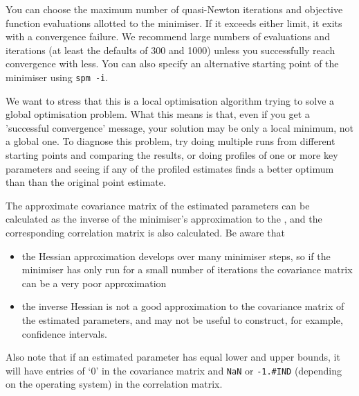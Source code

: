 You can choose the maximum number of quasi-Newton iterations and objective function evaluations allotted to the minimiser. If it exceeds either limit, it exits with a convergence failure. We recommend large numbers of evaluations and iterations (at least the defaults of 300 and 1000) unless you successfully reach convergence with less. You can also specify an alternative starting point of the minimiser using \texttt{spm -i}.

We want to stress that this is a local optimisation algorithm trying to solve a global optimisation problem. What this means is that, even if you get a 'successful convergence' message, your solution may be only a local minimum, not a global one. To diagnose this problem, try doing multiple runs from different starting points and comparing the results, or doing profiles of one or more key parameters and seeing if any of the profiled estimates finds a better optimum than than the original point estimate.

The approximate covariance matrix of the estimated parameters can be calculated as the inverse of the minimiser's approximation to the , and the corresponding correlation matrix is also calculated. Be aware that

\begin{itemize}
\item the Hessian approximation develops over many minimiser steps, so if the minimiser has only run for a small number of iterations the covariance matrix can be a very poor approximation
\item the inverse Hessian is not a good approximation to the covariance matrix of the estimated parameters, and may not be useful to construct, for example, confidence intervals. 
\end{itemize}

Also note that if an estimated parameter has equal lower and upper bounds, it will have entries of `0' in the covariance matrix and \texttt{NaN} or \texttt{-1.\#IND} (depending on the operating system) in the correlation matrix. 

\subsubsection{}

